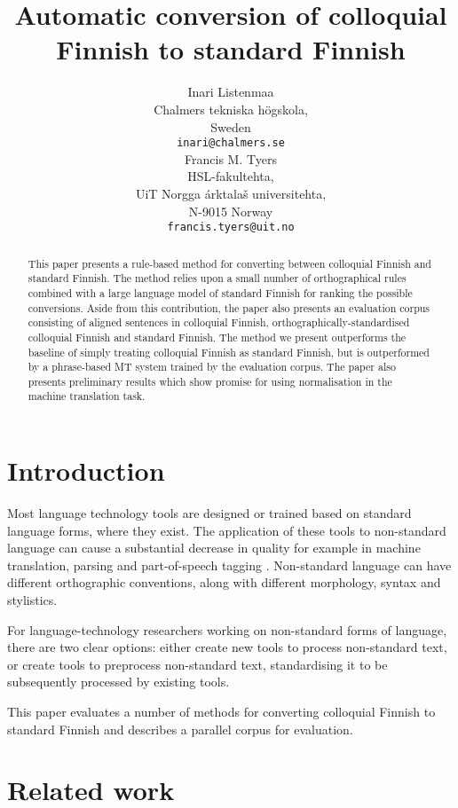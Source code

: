 \documentclass[11pt]{article}
\title{Automatic conversion of colloquial Finnish to standard Finnish}
\author{ Inari Listenmaa\\
  Chalmers tekniska h\"{o}gskola, \\
  Sweden \\
  {\tt inari@chalmers.se} \\\And
 Francis M. Tyers\\
  HSL-fakultehta, \\
  UiT Norgga \'{a}rktala\v{s} universitehta, \\
  N-9015 Norway \\
  {\tt francis.tyers@uit.no} }
\date{}
\begin{document}
\maketitle
\begin{abstract}
  This paper presents a rule-based method for converting between colloquial Finnish
  and standard Finnish. The method relies upon a small number of orthographical rules
  combined with a large language model of standard Finnish for ranking the possible 
  conversions. Aside from this contribution, the paper also presents an evaluation
  corpus consisting of aligned sentences in colloquial Finnish, orthographically-standardised
  colloquial Finnish and standard Finnish. The method we present outperforms the baseline
  of simply treating colloquial Finnish as standard Finnish, but is outperformed by a phrase-based 
 MT system trained by the evaluation corpus.
  The paper also presents preliminary results which show promise for using normalisation in 
  the machine translation task.
\end{abstract}

\section{Introduction}

Most language technology tools are designed or trained based on standard language 
forms, where they exist. The application of these tools to non-standard
language can cause a substantial decrease in quality for example in machine translation,
parsing and part-of-speech tagging \cite{eisenstein2013}. Non-standard language can 
have different orthographic conventions, along with different morphology, syntax and stylistics.

For language-technology researchers working on non-standard forms of language, there are 
two clear options: either create new tools to process non-standard text,
  or create tools to preprocess non-standard text, standardising it to be subsequently processed
 by existing tools.

This paper evaluates a number of methods for converting colloquial Finnish to 
standard Finnish and describes a parallel corpus for evaluation.

\section{Related work}
\end{document}
